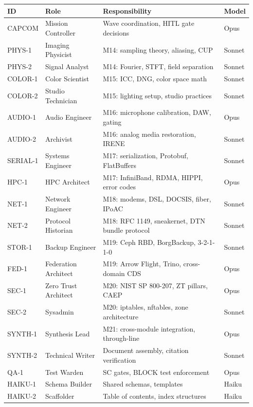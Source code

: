 \documentclass[11pt,letterpaper]{article}
\newcommand{\thead}[1]{\cellcolor{TableHead}\textbf{\sffamily\color{white}\small #1}}
\newcommand{\altrow}{\rowcolor{TableAlt}}
\begin{document}
\begin{longtable}{p{1.8cm}p{3.5cm}p{5cm}p{2.2cm}}
\toprule
\thead{ID} & \thead{Role} & \thead{Responsibility} & \thead{Model} \\
\midrule
\endhead
CAPCOM & Mission Controller & Wave coordination, HITL gate decisions & Opus \\
\altrow PHYS-1 & Imaging Physicist & M14: sampling theory, aliasing, CUP & Sonnet \\
PHYS-2 & Signal Analyst & M14: Fourier, STFT, field separation & Sonnet \\
\altrow COLOR-1 & Color Scientist & M15: ICC, DNG, color space math & Sonnet \\
COLOR-2 & Studio Technician & M15: lighting setup, studio practices & Sonnet \\
\altrow AUDIO-1 & Audio Engineer & M16: microphone calibration, DAW, gating & Opus \\
AUDIO-2 & Archivist & M16: analog media restoration, IRENE & Sonnet \\
\altrow SERIAL-1 & Systems Engineer & M17: serialization, Protobuf, FlatBuffers & Sonnet \\
HPC-1 & HPC Architect & M17: InfiniBand, RDMA, HIPPI, error codes & Opus \\
\altrow NET-1 & Network Engineer & M18: modems, DSL, DOCSIS, fiber, IPoAC & Sonnet \\
NET-2 & Protocol Historian & M18: RFC 1149, sneakernet, DTN bundle protocol & Sonnet \\
\altrow STOR-1 & Backup Engineer & M19: Ceph RBD, BorgBackup, 3-2-1-1-0 & Sonnet \\
FED-1 & Federation Architect & M19: Arrow Flight, Trino, cross-domain CDS & Opus \\
\altrow SEC-1 & Zero Trust Architect & M20: NIST SP 800-207, ZT pillars, CAEP & Opus \\
SEC-2 & Sysadmin & M20: iptables, nftables, zone architecture & Sonnet \\
\altrow SYNTH-1 & Synthesis Lead & M21: cross-module integration, through-line & Opus \\
SYNTH-2 & Technical Writer & Document assembly, citation verification & Sonnet \\
\altrow QA-1 & Test Warden & SC gates, BLOCK test enforcement & Opus \\
HAIKU-1 & Schema Builder & Shared schemas, templates & Haiku \\
\altrow HAIKU-2 & Scaffolder & Table of contents, index structures & Haiku \\
\bottomrule
\end{longtable}
\end{document}
